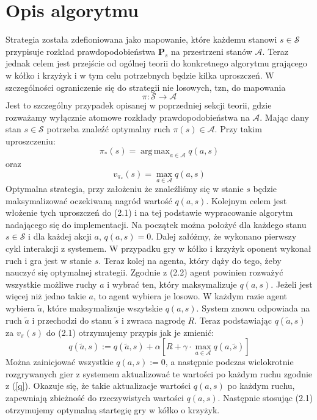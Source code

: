 \documentclass[licencjacka]{pracamgr}
\DeclareMathOperator*{\argmax}{arg\,max}
\begin{document}
\section{Opis algorytmu}
Strategia została zdefioniowana jako mapowanie, które każdemu stanowi $s\in\mathcal{S}$ przypisuje rozkład prawdopodobieństwa $\mathbf{P}_{s}$ na przestrzeni stanów $\mathcal{A}$. Teraz jednak celem jest przejście od ogólnej teorii do konkretnego algorytmu grającego w kółko i krzyżyk i w tym celu potrzebnych będzie kilka uproszczeń. W szczególności ograniczenie się do strategii nie losowych, tzn, do mapowania
$$\pi : \mathcal{S}\rightarrow\mathcal{A}$$
Jest to szczególny przypadek opisanej w poprzedniej sekcji teorii, gdzie rozważamy wyłącznie atomowe rozkłady prawdopodobieństwa na $\mathcal{A}$. Mając dany stan $s\in\mathcal{S}$ potrzeba znaleźć optymalny ruch $\pi(s)\in\mathcal{A}$.  Przy takim uproszczeniu:
	$$\pi_{*}(s) = \argmax_{a\in\mathcal{A}} q(a,s)$$
		oraz
	$$v_{\pi_{*}}(s)=\max_{a\in\mathcal{A}} q(a,s)$$
Optymalna strategia, przy założeniu że znaleźliśmy się w stanie $s$ będzie maksymalizować oczekiwaną nagród wartość $q(a,s)$. Kolejnym celem jest włożenie tych uproszczeń do (2.1) i na tej podstawie wypracowanie algorytm nadającego się do implementacji. Na początek można położyć dla każdego stanu $s\in\mathcal{S}$ i dla każdej akcji $a$, $q(a,s) = 0$.  Dalej załóżmy, że wykonano pierwszy cykl interakcji  z systemem. W przypadku gry w kółko i krzyżyk oponent wykonał ruch i gra jest w stanie $s$. Teraz kolej na agenta, który dąży do tego, żeby nauczyć się optymalnej strategii. Zgodnie z (2.2) agent powinien rozważyć wszystkie możliwe ruchy $a$ i wybrać ten, który maksymalizuje $q(a, s)$. Jeżeli jest więcej niż jedno takie $a$, to agent wybiera je losowo. W każdym razie agent wybiera  $\tilde{a}$, które maksymalizuje wszytskie $q(a,s)$. System znowu odpowiada na ruch $\tilde{a}$  i przechodzi do stanu $\tilde{s}$ i zwraca nagrodę $R$. Teraz podstawiając $q(\tilde{a},s)$ za $v_{\pi}(s)$ do (2.1) otrzymujemy przypis jak je  zmienić:\\
\begin{equation}
\label{q}
	q(\tilde{a},s) := q(\tilde{a},s) +\alpha[R + \gamma\cdot\max_{a\in\mathcal{A}}q(a,\tilde{s})]
\end{equation}
Można zainicjować wszystkie $q(a,s):=0$, a następnie podczas wielokrotnie rozgrywanych gier z systemem aktualizować te wartości po każdym ruchu zgodnie z (\ref{q}). Okazuje się, że takie aktualizacje wartości $q(a,s)$ po każdym ruchu, zapewniają zbieżność do rzeczywistych wartości  $q(a,s)$. Następnie stosując (2.1) otrzymujemy optymalną startegię gry w kółko o krzyżyk.
\end{document}
